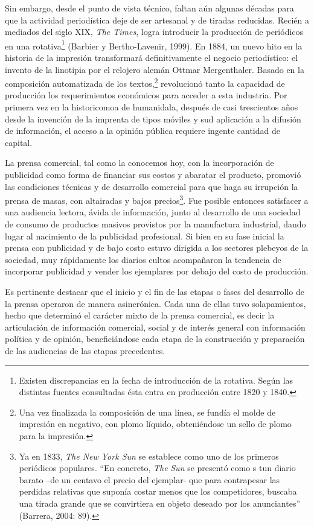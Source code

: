 Sin embargo, desde el punto de vista técnico, faltan aún algunas décadas para que la actividad periodística deje de ser artesanal y de tiradas reducidas. Recién a mediados del siglo XIX, \emph{The Times}, logra introducir la producción de periódicos en una rotativa\footnote{Existen discrepancias en la fecha de introducción de la rotativa. Según las distintas fuentes consultadas ésta entra en producción entre 1820 y 1840.} (Barbier y Bertho-Lavenir, 1999). En 1884, un nuevo hito en la historia de la impresión transformará definitivamente el negocio periodístico: el invento de la linotipia por el relojero alemán Ottmar Mergenthaler. Basado en la composición automatizada de los textos,\footnote{Una vez finalizada la composición de una línea, se fundía el molde de impresión en negativo, con plomo líquido, obteniéndose un sello de plomo para la impresión.} revolucionó tanto la capacidad de producción  los requerimientos económicos para acceder a esta industria. Por primera vez en la historicomoa de  humanidala, después de casi trescientos años desde la invención de la imprenta de tipos móviles y sud aplicación a la difusión de información, el acceso a la opinión pública requiere ingente cantidad de capital.

La prensa comercial, tal como la conocemos hoy, con la incorporación de publicidad como forma de financiar sus costos y abaratar el producto, promovió las condiciones técnicas y de desarrollo comercial para que haga su irrupción la prensa de masas, con altairadas y bajos precios\footnote{Ya en 1833, \emph{The New York Sun} se establece como uno de los primeros periódicos populares. \enquote{En concreto, \emph{The} \emph{Sun} se presentó como s tun diario barato --de un centavo el precio del ejemplar- que para contrapesar las perdidas relativas que suponía costar menos que los competidores, buscaba una tirada grande que se convirtiera en objeto deseado por los anunciantes} (Barrera, 2004: 89).}. Fue posible entonces satisfacer a una audiencia lectora, ávida de información, junto al desarrollo de una sociedad de consumo de productos masivos provistos por la manufactura industrial, dando lugar al nacimiento de la publicidad profesional. Si bien en su fase inicial la prensa con publicidad y de bajo costo estuvo dirigida a los sectores plebeyos de la sociedad, muy rápidamente los diarios cultos acompañaron la tendencia de incorporar publicidad y vender los ejemplares por debajo del costo de producción.

Es pertinente destacar que el inicio y el fin de las etapas o fases del desarrollo de la prensa operaron de manera asincrónica. Cada una de ellas tuvo solapamientos, hecho que determinó el carácter mixto de la prensa comercial, es decir la articulación de información comercial, social y de interés general con información política y de opinión, beneficiándose cada etapa de la construcción y preparación de las audiencias de las etapas precedentes.

